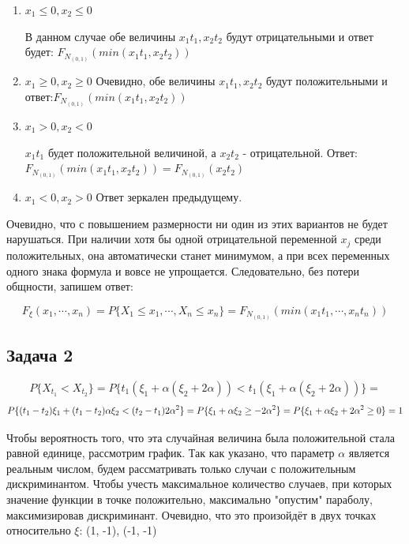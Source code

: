\documentclass[a4paper,12pt]{article}
\def \mbb{\mathbb}
\def \P{\mbb{P}}
\begin{document}
\begin{enumerate}[\Sun]
	\item $ x_1 \le 0, x_2 \le 0 $
	
	В данном случае обе величины $ x_1 t_1, x_2 t_2 $ будут отрицательными и ответ будет: $ F_{N_{(0,1)}}(min(x_1 t_1, x_2 t_2)) $
	
	\item $ x_1 \ge 0, x_2 \ge 0 $ 
	Очевидно, обе величины $ x_1 t_1, x_2 t_2 $ будут положительными и ответ:$ F_{N_{(0,1)}}(min(x_1 t_1, x_2 t_2)) $
	
	\item $ x_1 > 0, x_2 < 0 $ 
	
	$ x_1 t_1 $ будет положительной величиной, а $ x_2 t_2 $ - отрицательной. Ответ: $ F_{N_{(0,1)}}(min(x_1 t_1, x_2 t_2)) = F_{N_{(0,1)}}(x_2 t_2) $
	
	\item $ x_1 < 0, x_2 > 0 $ 
		Ответ зеркален предыдущему. 
		
\end{enumerate}
Очевидно, что с повышением размерности ни один из этих вариантов не будет нарушаться. При наличии хотя бы одной отрицательной переменной $ x_j $ среди положительных, она автоматически станет минимумом, а при всех переменных одного знака формула и вовсе не упрощается. Следовательно, без потери общности, запишем ответ:

\[  	 F_\xi(x_1, \cdots, x_n) = P\{X_1 \le x_1,\cdots, X_n \le x_n\} =  F_{N_{(0,1)}}(min(x_1 t_1, \cdots, x_n t_n)) \]

\subsection{Задача 2}

\[ P\{X_{t_1} < X_{t_2}\} = P\{t_1(\xi_1 + \alpha(\xi_2 + 2\alpha))<t_1(\xi_1 + \alpha(\xi_2 + 2\alpha)) \}=  \]
\[
P\{ (t_1 - t_2)\xi_1 + (t_1 - t_2)\alpha \xi_2 < (t_2 - t_1)2\alpha^2\} = \\P\{ \xi_1 + \alpha\xi_2 \ge -2\alpha^2\} = P\{ \xi_1 + \alpha\xi_2 + 2\alpha^2 \ge 0\} = 1\]
	
	
Чтобы вероятность того, что эта случайная величина была положительной стала равной единице, рассмотрим график. Так как указано, что параметр $ \alpha $ является реальным числом, будем рассматривать только случаи с положительным дискриминантом. Чтобы учесть максимальное количество случаев, при которых значение функции в точке положительно, максимально "опустим" параболу, максимизировав дискриминант. Очевидно, что это произойдёт в двух точках относительно $ \xi $: (1, -1), (-1, -1)
\end{document}
